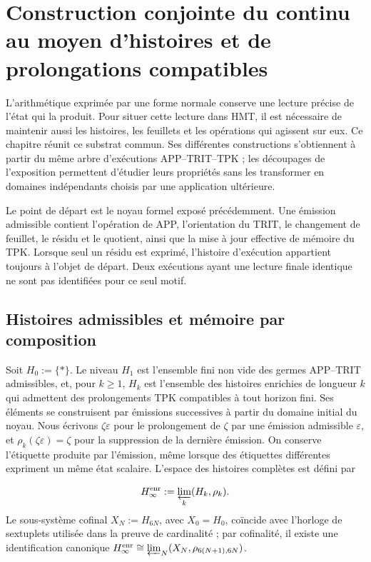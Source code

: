\section{Construction conjointe du continu au moyen d'histoires et de prolongations compatibles}
\label{iv:continuo-conjunto}
L’arithmétique exprimée par une forme normale conserve une lecture précise de l’état qui la produit. Pour situer cette lecture dans HMT, il est nécessaire de maintenir aussi les histoires, les feuillets et les opérations qui agissent sur eux. Ce chapitre réunit ce substrat commun. Ses différentes constructions s’obtiennent à partir du même arbre d’exécutions APP–TRIT–TPK ; les découpages de l’exposition permettent d’étudier leurs propriétés sans les transformer en domaines indépendants choisis par une application ultérieure.

Le point de départ est le noyau formel exposé précédemment. Une émission admissible contient l’opération de APP, l’orientation du TRIT, le changement de feuillet, le résidu et le quotient, ainsi que la mise à jour effective de mémoire du TPK. Lorsque seul un résidu est exprimé, l’histoire d’exécution appartient toujours à l’objet de départ. Deux exécutions ayant une lecture finale identique ne sont pas identifiées pour ce seul motif.



\subsection{Histoires admissibles et mémoire par composition}
Soit \(H_0:=\{\ast\}\). Le niveau \(H_1\) est l’ensemble fini non vide des
germes APP--TRIT admissibles, et, pour \(k\geq1\), \(H_k\) est l’ensemble des
histoires enrichies de longueur \(k\) qui admettent des prolongements TPK
compatibles à tout horizon fini. Ses éléments se construisent par émissions
successives à partir du domaine initial du noyau. Nous écrivons \(\zeta\varepsilon\)
pour le prolongement de \(\zeta\) par une émission admissible \(\varepsilon\), et
\(\rho_k(\zeta\varepsilon)=\zeta\) pour la suppression de la dernière émission. On
conserve l’étiquette produite par l’émission, même lorsque des étiquettes
différentes expriment un même état scalaire. L’espace des histoires complètes
est défini par

\[
 H_\infty^{\rm enr}:=\varprojlim_k(H_k,\rho_k).
\]
Le sous-système cofinal \(X_N:=H_{6N}\), avec \(X_0=H_0\), coïncide avec l'horloge
de sextuplets utilisée dans la preuve de cardinalité ; par cofinalité, il existe une
identification canonique
\(H_\infty^{\rm enr}\cong\varprojlim_N(X_N,\rho_{6(N+1),6N})\).

